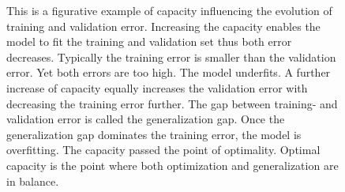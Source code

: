\begin{figure}[htbp!]
	\centering
	
	\caption{This is a figurative example of capacity influencing the evolution of training and validation error. Increasing the capacity enables the model to fit the training and validation set thus both error decreases. Typically the training error is smaller than the validation error. Yet both errors are too high. The model underfits. A further increase of capacity equally increases the validation error with decreasing the training error further. The gap between training- and validation error is called the generalization gap. Once the generalization gap dominates the training error, the model is overfitting. The capacity passed the point of optimality. Optimal capacity is the point where both optimization and generalization are in balance.}
	\label{Fig:Capacity}
\end{figure}\noindent

